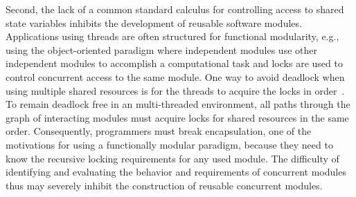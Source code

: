 Second, the lack of a common standard calculus for controlling access to shared state variables inhibits the development of reusable software modules.
Applications using threads are often structured for functional modularity, e.g., using the object-oriented paradigm where independent modules use other independent modules to accomplish a computational task and locks are used to control concurrent access to the same module.
One way to avoid deadlock when using multiple shared resources is for the threads to acquire the locks in order~\cite{havender1968avoiding}.
To remain deadlock free in an multi-threaded environment, all paths through the graph of interacting modules must acquire locks for shared resources in the same order.
Consequently, programmers must break encapsulation, one of the motivations for using a functionally modular paradigm, because they need to know the recursive locking requirements for any used module.
The difficulty of identifying and evaluating the behavior and requirements of concurrent modules thus may severely inhibit the construction of reusable concurrent modules.



